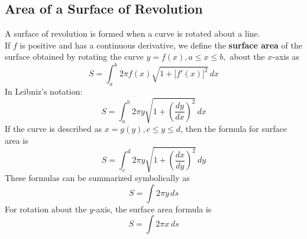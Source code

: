 \subsection{Area of a Surface of Revolution}

A surface of revolution is formed when a curve is rotated about a line. \\
If \(f\) is positive and has a continuous derivative, we define the
\textbf{surface area} of the surface obtained by rotating the curve
\(y=f(x),a\leq x\leq b,\) about the \(x\)-axis as
\[S=\int_a^b 2\pi f(x)\sqrt{1+\big[f'(x)\big]^2}\,dx\]
In Leibniz's notation:
\[S=\int_a^b 2\pi y\sqrt{1+\left(\frac{dy}{dx}\right)^2}\,dx\]
If the curve is described as \(x=g(y),c\leq y\leq d\), then the formula for
surface area is
\[S=\int_c^d 2\pi y\sqrt{1+\left(\frac{dx}{dy}\right)^2}\,dy\]
These formulas can be summarized symbolically as
\[S=\int 2\pi y\,ds\]
For rotation about the \(y\)-axis, the surface area formula is
\[S=\int 2\pi x\,ds\]